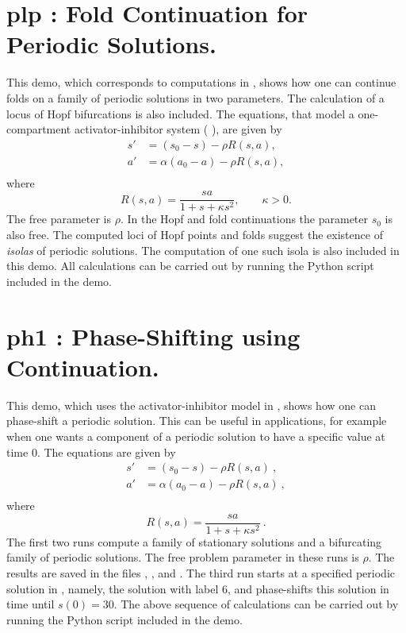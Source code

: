 \documentclass[12pt]{report}
\begin{document}
\section{ plp : Fold Continuation for Periodic Solutions.} \label{sec:Demos_plp}
This demo, which corresponds to computations in 
 \citeyear{DoKeKe:91a}, shows how one can
continue folds on a family of periodic solutions in two parameters.
The calculation of a locus of Hopf bifurcations is also included.
The equations, that model a one-compartment activator-inhibitor system 
( \citeyear{JPK:80}),
are given by
\begin{equation} \begin{array}{cl}
 s' &= (s_{0} - s) - \rho R (s,a), \\
 a' &=\alpha (a_{0} - a) - \rho R (s,a), \\
\end{array} \end{equation}
where
$$ R(s,a)=\frac{s a}{1+s+ \kappa s^{2} },
\qquad \kappa  > 0. $$
The free parameter is $\rho$.
In the Hopf and fold continuations the parameter $s_0$ is also free.
The computed loci of Hopf points and folds suggest the existence
of {\it isolas} of periodic solutions. The computation of one such 
isola is also included in this demo. All calculations can be carried 
out by running the Python script  included in the demo.

\newpage
\section{ ph1 : Phase-Shifting using Continuation.} \label{sec:Demos_ph1}
This demo, which uses the activator-inhibitor model in 
 \citeyear{DoKeKe:91a}, shows how one can
phase-shift a periodic solution. This can be useful in applications, for example 
when one wants a component of a periodic solution to have a specific value at 
time $0$.
The equations are given by
\begin{equation} \begin{array}{cl}
 s' &= (s_{0} - s) - \rho R (s,a)~, \\
 a' &=\alpha (a_{0} - a) - \rho R (s,a)~, \\
\end{array} \end{equation}
where
$$ R(s,a)=\frac{s a}{1+s+ \kappa s^{2} }~.$$
The first two runs compute a family
of stationary solutions and a bifurcating family of periodic solutions.
The free problem parameter in these runs is $\rho$.
The results are saved in the files , , and .
The third run starts at a specified
periodic solution in , namely, the solution with label $6$, and
phase-shifts this solution in time until $s(0)=30$. The above sequence of 
calculations can be carried out by running the Python script  
included in the demo.
\end{document}
